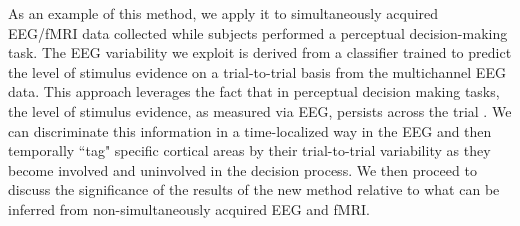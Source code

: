 As an example of this method, we apply it to simultaneously acquired EEG/fMRI data collected while subjects performed a perceptual decision-making task. The EEG variability we exploit is derived from a classifier trained to predict the level of stimulus evidence on a trial-to-trial basis from the multichannel EEG data.  This approach leverages the fact that in perceptual decision making tasks, the level of stimulus evidence, as measured via EEG, persists across the trial  \cite{Banko2011a,Philiastides2006}. We can discriminate this information in a time-localized way in the EEG and then temporally ``tag" specific cortical areas by their trial-to-trial variability as they become involved and uninvolved in the decision process. We then proceed to discuss the significance of the results of the new method relative to what can be inferred from non-simultaneously acquired EEG and fMRI.